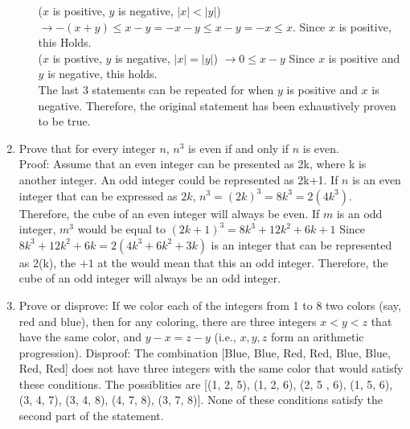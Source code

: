 \documentclass{article}
\begin{document}
\begin{enumerate}
\begin{enumerate}
            ($x$ is positive, $y$ is negative, $|x| < |y|$) $\rightarrow -(x+y) \leq x-y = -x-y \leq x-y = -x \leq x$. Since $x$ is positive, this Holds. \\
            ($x$ is postive, $y$ is negative, $|x| = |y|$) $\rightarrow 0 \leq x - y$  Since $x$ is positive and $y$ is negative, this holds. \\
            The last 3 statements can be repeated for when $y$ is positive and $x$ is negative. Therefore, the original statement has been exhaustively proven to be true. \Squaresteel
    \end{enumerate}
\item Prove that for every integer $n$, $n^3$ is even if and only if $n$ is even. \\
    Proof: Assume that an even integer can be presented as 2k, where k is another integer. An odd integer could be represented as 2k+1. If $n$ is an even integer that can be expressed as $2k$, $n^3 = (2k)^3 = 8k^3 = 2(4k^3)$. Therefore, the cube of an even integer will always be even. If $m$ is an odd integer, $m^3$ would be equal to $(2k+1)^3 = 8k^3 + 12k^2 + 6k + 1$ Since $8k^3 + 12k^2 + 6k = 2(4k^3+6k^2+3k)$ is an integer that can be represented as 2(k), the $+1$ at the would mean that this an odd integer. Therefore, the cube of an odd integer will always be an odd integer.
\item Prove or disprove: If we color each of the integers from 1 to 8 two colors (say, red and blue), then for any coloring, there are three integers $x<y<z$ that have the same color, and $y-x=z-y$ (i.e., $x,y,z$ form an arithmetic progression).
    Disproof: The combination [Blue, Blue, Red, Red, Blue, Blue, Red, Red] does not have three integers with the same color that would satisfy these conditions. The possiblities are [(1, 2, 5), (1, 2, 6), (2, 5 , 6), (1, 5, 6), (3, 4, 7), (3, 4, 8), (4, 7, 8), (3, 7, 8)]. None of these conditions satisfy the second part of the statement. 
\end{enumerate}
\end{document}

